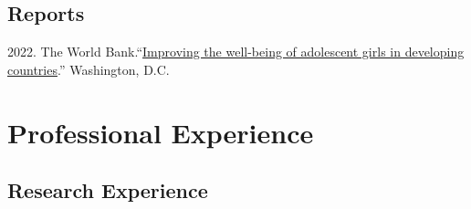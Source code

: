 \documentclass[a4paper, 10pt]{article}
\renewenvironment{itemize}{
  \begin{list}{}
    { \setlength{\itemsep}{5pt}
      \setlength{\parsep}{0pt}
      \setlength{\topsep}{0pt}
      \setlength{\leftmargin}{0em} } }{
  \end{list}}
\begin{document}
\subsection*{Reports}

\begin{itemize}
  \item 2022. The World Bank.``\href{https://documents1.worldbank.org/curated/en/099025312242111019/pdf/P1699940bcc13001a083820804f74e8151b.pdf}{Improving the well-being of adolescent girls in developing countries}.'' Washington, D.C.
\end{itemize}


\section*{Professional Experience}

\subsection*{Research Experience}
\end{document}
